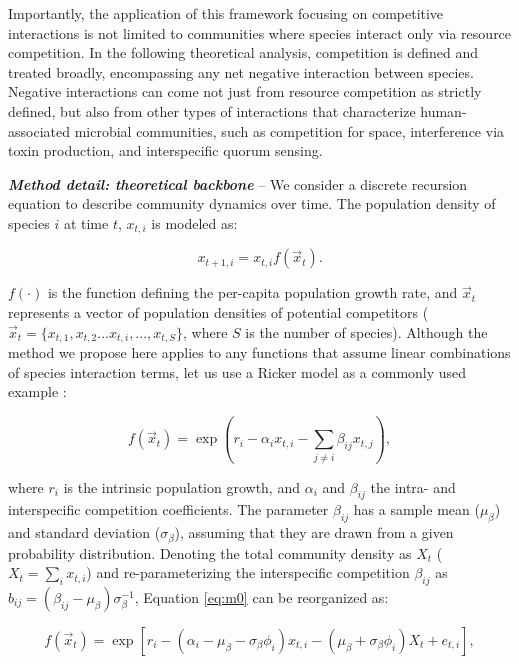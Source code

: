 \documentclass[12pt, class=article, crop=false]{standalone}
\begin{document}
Importantly, the application of this framework focusing on competitive interactions is not limited to communities where species interact only via resource competition.
In the following theoretical analysis, competition is defined and treated broadly, encompassing any net negative interaction between species.
Negative interactions can come not just from resource competition as strictly defined, but also from other types of interactions that characterize human-associated microbial communities, such as competition for space, interference via toxin production, and interspecific quorum sensing.

\textbf{\textit{Method detail: theoretical backbone}} -- 
We consider a discrete recursion equation to describe community dynamics over time. The population density of species $i$ at time $t$, $x_{t,i}$ is modeled as:

\begin{equation}
\label{eq:m0}
x_{t + 1, i} = x_{t, i} f(\overset{\rightarrow}{x}_{t}).
\end{equation}

$f(\cdot)$ is the function defining the per-capita population growth rate, and $\overset{\rightarrow}{x}_{t}$ represents a vector of population densities of potential competitors ($\overset{\rightarrow}{x}_{t} = \{x_{t,1}, x_{t,2}...x_{t,i},...,x_{t,S}\}$, where $S$ is the number of species).
Although the method we propose here applies to any functions that assume linear combinations of species interaction terms, let us use a Ricker model as a commonly used example \citep{ricker_stock_1954, fowler_species_2012, terui_intentional_2023}:

\begin{equation}
\label{eq:ricker}
f(\overset{\rightarrow}{x}_{t}) = \exp(r_i - \alpha_i x_{t,i} - \sum_{j \ne i} \beta_{ij} x_{t,j}),
\end{equation}

where $r_i$ is the intrinsic population growth, and $\alpha_{i}$ and $\beta_{ij}$ the intra- and interspecific competition coefficients.
The parameter $\beta_{ij}$ has a sample mean ($\mu_{\beta}$) and standard deviation ($\sigma_{\beta}$), assuming that they are drawn from a given probability distribution. 
Denoting the total community density as $X_t$ ($X_t = \sum_i x_{t,i}$) and re-parameterizing the interspecific competition $\beta_{ij}$ as $b_{ij} = (\beta_{ij} - \mu_{\beta}) \sigma_{\beta}^{-1}$, Equation \ref{eq:m0} can be reorganized as:

\begin{equation}
\label{eq:rickermod0}
f(\overset{\rightarrow}{x}_{t}) = \exp\left[r_i - (\alpha_i - \mu_{\beta} - \sigma_{\beta} \phi_i) x_{t,i} - (\mu_{\beta} +  \sigma_{\beta} \phi_i) X_t + e_{t,i} \right],
\end{equation}
\end{document}
